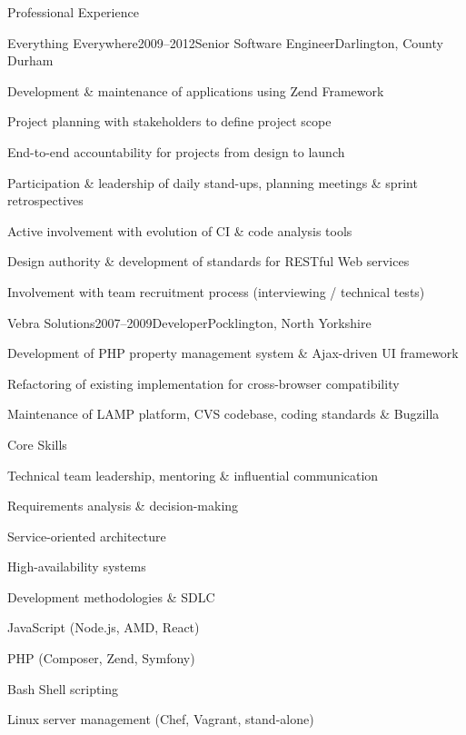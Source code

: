\documentclass{cv}
\begin{document}
\begin{rSection}{Professional Experience}
\begin{rSubsection}{Everything Everywhere}{2009--2012}{Senior Software Engineer}{Darlington, County Durham}
\item Development \& maintenance of applications using Zend Framework
\item Project planning with stakeholders to define project scope
\item End-to-end accountability for projects from design to launch
\item Participation \& leadership of daily stand-ups, planning meetings \& sprint retrospectives
\item Active involvement with evolution of CI \& code analysis tools
\item Design authority \& development of standards for RESTful Web services
\item Involvement with team recruitment process (interviewing / technical tests)
\end{rSubsection}


\begin{rSubsection}{Vebra Solutions}{2007--2009}{Developer}{Pocklington, North Yorkshire}
\item Development of PHP property management system \& Ajax-driven UI framework
\item Refactoring of existing implementation for cross-browser compatibility
\item Maintenance of LAMP platform, CVS codebase, coding standards \& Bugzilla
\end{rSubsection}

\end{rSection}


\begin{rSection}{Core Skills}

\begin{rSubsection}{}{}{}{}
\item Technical team leadership, mentoring \& influential communication
\item Requirements analysis \& decision-making
\item Service-oriented architecture
\item High-availability systems
\item Development methodologies \& SDLC
\item JavaScript (Node.js, AMD, React)
\item PHP (Composer, Zend, Symfony)
\item Bash Shell scripting
\item Linux server management (Chef, Vagrant, stand-alone)
\end{rSubsection}

\end{rSection}
\end{document}
